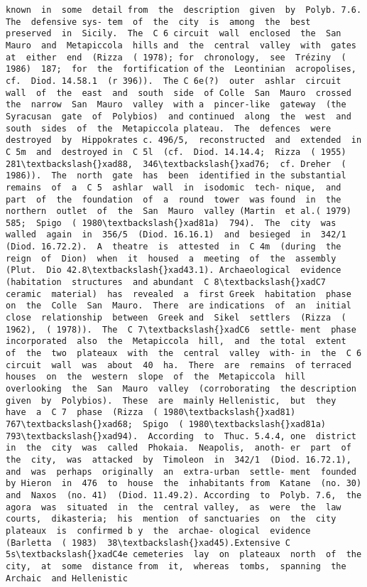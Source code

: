 \documentclass[11pt]{article}
\begin{document}
\begin{Verbatim}[commandchars=\\\{\}]
known  in  some  detail from  the  description  given  by  Polyb. 7.6.  The  defensive sys- tem  of  the  city  is  among  the  best  preserved  in  Sicily.  The  C 6 circuit  wall  enclosed  the  San  Mauro  and  Metapiccola  hills and  the  central  valley  with  gates  at  either  end  (Rizza  ( 1978); for  chronology,  see  Tréziny  ( 1986)  187;  for  the  fortification of the  Leontinian  acropolises,  cf.  Diod. 14.58.1  (r 396)).  The C 6e(?)  outer  ashlar  circuit  wall  of  the  east  and  south  side  of Colle  San  Mauro  crossed  the  narrow  San  Mauro  valley  with a  pincer-like  gateway  (the  Syracusan  gate  of  Polybios)  and continued  along  the  west  and  south  sides  of  the  Metapiccola plateau.  The  defences  were  destroyed  by  Hippokrates c. 496/5,  reconstructed  and  extended  in  C 5m  and  destroyed in  C 5l  (cf.  Diod. 14.14.4;  Rizza  ( 1955)  281\textbackslash{}xad88,  346\textbackslash{}xad76;  cf. Dreher  ( 1986)).  The  north  gate  has  been  identified in the substantial  remains  of  a  C 5  ashlar  wall  in  isodomic  tech- nique,  and  part  of  the  foundation  of  a  round  tower  was found  in  the  northern  outlet  of  the  San  Mauro  valley (Martin  et al.( 1979)  585;  Spigo  ( 1980\textbackslash{}xad81a)  794).  The  city  was walled  again  in  356/5  (Diod. 16.16.1)  and  besieged  in  342/1 (Diod. 16.72.2).  A  theatre  is  attested  in  C 4m  (during  the reign  of  Dion)  when  it  housed  a  meeting  of  the  assembly (Plut.  Dio 42.8\textbackslash{}xad43.1). Archaeological  evidence  (habitation  structures  and abundant  C 8\textbackslash{}xadC7  ceramic  material)  has  revealed  a  first Greek  habitation  phase  on  the  Colle  San  Mauro.  There  are indications  of  an  initial  close  relationship  between  Greek and  Sikel  settlers  (Rizza  ( 1962),  ( 1978)).  The  C 7\textbackslash{}xadC6  settle- ment  phase  incorporated  also  the  Metapiccola  hill,  and  the total  extent  of  the  two  plateaux  with  the  central  valley  with- in  the  C 6  circuit  wall  was  about  40  ha.  There  are  remains  of terraced  houses  on  the  western  slope  of  the  Metapiccola  hill overlooking  the  San  Mauro  valley  (corroborating  the description  given  by  Polybios).  These  are  mainly Hellenistic,  but  they  have  a  C 7  phase  (Rizza  ( 1980\textbackslash{}xad81) 767\textbackslash{}xad68;  Spigo  ( 1980\textbackslash{}xad81a)  793\textbackslash{}xad94).  According  to  Thuc. 5.4.4, one  district  in  the  city  was  called  Phokaia.  Neapolis,  anoth- er  part  of  the  city,  was  attacked  by  Timoleon  in  342/1  (Diod. 16.72.1),  and  was  perhaps  originally  an  extra-urban  settle- ment  founded  by Hieron  in  476  to  house  the  inhabitants from  Katane  (no. 30)  and  Naxos  (no. 41)  (Diod. 11.49.2). According  to  Polyb. 7.6,  the  agora  was  situated  in  the  central valley,  as  were  the  law  courts,  dikasteria;  his  mention  of sanctuaries  on  the  city  plateaux  is  confirmed b y  the  archae- ological  evidence  (Barletta  ( 1983)  38\textbackslash{}xad45).Extensive C 5s\textbackslash{}xadC4e cemeteries  lay  on  plateaux  north  of  the  city,  at  some  distance from  it,  whereas  tombs,  spanning  the  Archaic  and Hellenistic  
\end{Verbatim}
\end{document}
